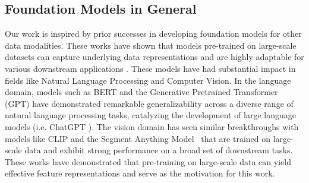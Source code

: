 \subsection{Foundation Models in General}
Our work is inspired by prior successes in developing foundation models for other data modalities. These works have shown that models  pre-trained on large-scale datasets can capture underlying data representations and are highly adaptable for various downstream applications \cite{bommasani2021oppoandriskforfm}. These models have had substantial impact in fields like Natural Language Processing and Computer Vision. In the language domain, models such as BERT \citep{devlin2018bert} and the Generative Pretrained Transformer (GPT) \citep{radford2018improving} have demonstrated remarkable generalizability across a diverse range of natural language processing tasks, catalyzing the development of large language models (i.e. ChatGPT \cite{zhou2024comprehensive}). 
The vision domain has seen similar breakthroughs with models like CLIP \citep{radford2021learning} and the Segment Anything Model~\cite{kirillov2023segment} that are trained on large-scale data and exhibit strong performance on a broad set of downstream tasks. These works have demonstrated that pre-training on large-scale data can yield effective feature representations and serve as the motivation for this work.